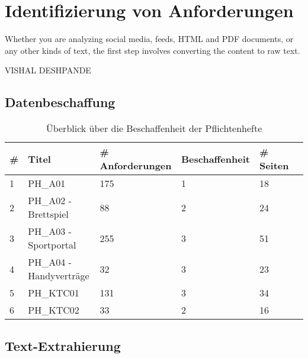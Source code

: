 \chapter{Identifizierung von Anforderungen}
\label{cha:durchfuehrungfeature}

\epigraph{Whether you are analyzing social media, feeds, HTML and PDF documents, or any other kinds of text, the first step involves converting the content to raw text.}{VISHAL DESHPANDE}

\lipsum[3]

\section{Datenbeschaffung}
\label{sec:datenbeschaffung}

\lipsum[3]

\begin{savenotes}
    \begin{table}[!ht]
        \small
        \centering
        \begin{tabular}{llllll}
        \hline
        \#                      & Titel         & \# Anforderungen         & Beschaffenheit   & \# Seiten     \\ \hline
        1                       & PH\_A01       & 175 & 1                & 18            \\
        \rowcolor[HTML]{EFEFEF} 
        2                       & PH\_A02 - Brettspiel       & 88 & 2                & 24            \\
        3                       & PH\_A03 - Sportportal       & 255 & 3                & 51            \\
        \rowcolor[HTML]{EFEFEF}
        4                       & PH\_A04 - Handyverträge     & 32   & 3                & 23            \\
        5                       & PH\_KTC01     & 131 & 3                & 34            \\
        \rowcolor[HTML]{EFEFEF}
        6                       & PH\_KTC02     & 33 & 2                & 16            \\   
        \end{tabular}
        \caption{Überblick über die Beschaffenheit der Pflichtenhefte}
        \label{tab:pflichtenhefte}
    \end{table}
\end{savenotes}

\section{Text-Extrahierung}
\label{sec:text-extrahierung}

